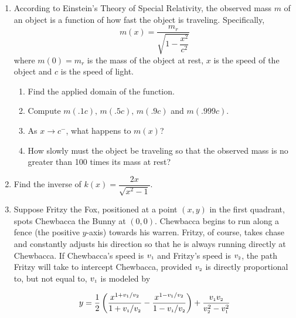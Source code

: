 \begin{enumerate}
\begin{enumerate}
\end{enumerate}




\item According to Einstein's Theory of Special Relativity, the observed mass $m$ of an object is a function of how fast the object is traveling.  Specifically, \[m(x) = \dfrac{m_{r}}{\sqrt{1 - \dfrac{x^{2}}{c^{2}}}}\] where $m(0)=m_{r}$ is the mass of the object at rest, $x$ is the speed of the object and $c$ is the speed of light. 

\begin{enumerate}

\item Find the applied domain of the function.

\item Compute $m(.1c), \, m(.5c), \, m(.9c)$ and $m(.999c)$.

\item As $x \rightarrow c^{-}$, what happens to $m(x)$?

\item How slowly must the object be traveling so that the observed mass is no greater than 100 times its mass at rest?

\end{enumerate}


\item Find the inverse of $k(x) = \dfrac{2x}{\sqrt{x^{2} - 1}}$.

\pagebreak

\item \label{pursuitfurther} Suppose Fritzy the Fox, positioned at a point $(x,y)$ in the first quadrant, spots Chewbacca the Bunny at $(0,0)$.   Chewbacca begins to run along a fence (the positive $y$-axis) towards his warren.  Fritzy, of course, takes chase and constantly adjusts his direction so that he is always running directly at Chewbacca.  If Chewbacca's speed is $v_{\mbox{\tiny$1$}}$ and  Fritzy's speed is $v_{\mbox{\tiny$2$}}$, the path Fritzy will take to intercept Chewbacca, provided $v_{\mbox{\tiny$2$}}$ is directly proportional to, but not equal to, $v_{\mbox{\tiny$1$}}$ is modeled by

\[ y = \dfrac{1}{2} \left(\dfrac{x^{1+ v_{1}/v_{2}}}{1+v_{\mbox{\tiny$1$}}/v_{\mbox{\tiny$2$}}}- \dfrac{x^{1-v_{\mbox{\tiny$1$}}/v_{\mbox{\tiny$2$}}}}{1-v_{\mbox{\tiny$1$}}/v_{\mbox{\tiny$2$}}}\right) + \dfrac{v_{\mbox{\tiny$1$}} v_{\mbox{\tiny$2$}}}{v_{\mbox{\tiny$2$}}^2-v_{\mbox{\tiny$1$}}^2} \]

\begin{enumerate}


\end{enumerate}
\end{enumerate}
